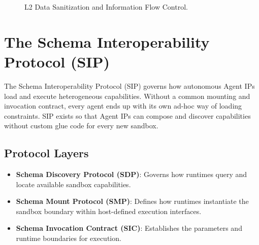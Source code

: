 \documentclass[10pt,journal,compsoc]{IEEEtran}
\begin{document}
\begin{figure}[h]
\centering
{}
\caption{L2 Data Sanitization and Information Flow Control.}
\label{fig:l2_sanitization}
\end{figure}


\section{The Schema Interoperability Protocol (SIP)}
\label{sec:sip}
The Schema Interoperability Protocol (SIP) governs how autonomous Agent IPs load and execute heterogeneous capabilities. Without a common mounting and invocation contract, every agent ends up with its own ad-hoc way of loading constraints. SIP exists so that Agent IPs can compose and discover capabilities without custom glue code for every new sandbox.

\subsection{Protocol Layers}
\begin{itemize}
  \item \textbf{Schema Discovery Protocol (SDP)}: Governs how runtimes query and locate available sandbox capabilities.
  \item \textbf{Schema Mount Protocol (SMP)}: Defines how runtimes instantiate the sandbox boundary within host-defined execution interfaces.
  \item \textbf{Schema Invocation Contract (SIC)}: Establishes the parameters and runtime boundaries for execution.
\end{itemize}
\end{document}
